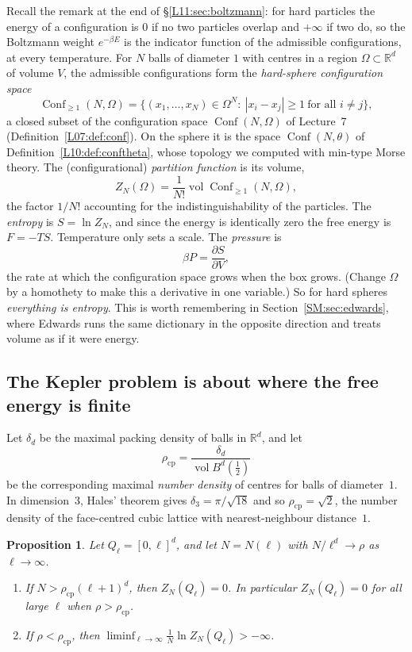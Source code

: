 \documentclass[11pt,openany]{book}
\theoremstyle{plain}
\newtheorem{proposition}[theorem]{Proposition}
\theoremstyle{definition}
\theoremstyle{remark}
\newcommand{\R}{\mathbb{R}}
\newcommand{\vol}{\operatorname{vol}}
\newcommand{\Conf}{\operatorname{Conf}}
\newcommand{\abs}[1]{\left\lvert #1 \right\rvert}
\newcommand{\dens}{\delta}             %
\newcommand{\Ball}{B}                  %
\begin{document}
Recall the remark at the end of \S\ref{L11:sec:boltzmann}: for hard particles the energy of a
configuration is $0$ if no two particles overlap and $+\infty$ if two do, so the Boltzmann weight
$e^{-\beta E}$ is the indicator function of the admissible configurations, at every temperature.
For $N$ balls of diameter $1$ with centres in a region $\Omega\subset\R^d$ of volume $V$, the
admissible configurations form the \emph{hard-sphere configuration space}
\[
  \Conf_{\ge1}(N,\Omega)=\{(x_1,\dots,x_N)\in\Omega^N:\ \abs{x_i-x_j}\ge1\ \text{for all }i\ne j\},
\]
a closed subset of the configuration space $\Conf(N,\Omega)$ of Lecture~7
(Definition~\ref{L07:def:conf}). On the sphere it is the space $\Conf(N,\theta)$ of
Definition~\ref{L10:def:conftheta}, whose topology we computed with min-type Morse theory. The
(configurational) \emph{partition function} is its volume,
\[
  Z_N(\Omega)=\frac1{N!}\vol\Conf_{\ge1}(N,\Omega),
\]
the factor $1/N!$ accounting for the indistinguishability of the particles. The \emph{entropy} is
$S=\ln Z_N$, and since the energy is identically zero the free energy is $F=-TS$. Temperature only
sets a scale. The \emph{pressure} is
\[
  \beta P=\frac{\partial S}{\partial V},
\]
the rate at which the configuration space grows when the box grows. (Change $\Omega$ by a homothety
to make this a derivative in one variable.) So for hard spheres \emph{everything is entropy}. This
is worth remembering in Section~\ref{SM:sec:edwards}, where Edwards runs the same dictionary in the
opposite direction and treats volume as if it were energy.

\subsection*{The Kepler problem is about where the free energy is finite}

Let $\dens_d$ be the maximal packing density of balls in $\R^d$, and let
\[
  \rho_{\mathrm{cp}}=\frac{\dens_d}{\vol\Ball^d(\tfrac12)}
\]
be the corresponding maximal \emph{number density} of centres for balls of diameter~$1$. In
dimension~$3$, Hales' theorem gives $\dens_3=\pi/\sqrt{18}$ and so $\rho_{\mathrm{cp}}=\sqrt2$, the
number density of the face-centred cubic lattice with nearest-neighbour distance~$1$.

\begin{proposition}\label{SM:prop:kepler}
Let $Q_\ell=[0,\ell]^d$, and let $N=N(\ell)$ with $N/\ell^d\to\rho$ as $\ell\to\infty$.
\begin{enumerate}[nosep]
\item If $N>\rho_{\mathrm{cp}}(\ell+1)^d$, then $Z_N(Q_\ell)=0$. In particular $Z_N(Q_\ell)=0$ for all
  large $\ell$ when $\rho>\rho_{\mathrm{cp}}$.
\item If $\rho<\rho_{\mathrm{cp}}$, then $\liminf_{\ell\to\infty}\frac1N\ln Z_N(Q_\ell)>-\infty$.
\end{enumerate}
\end{proposition}
\end{document}
